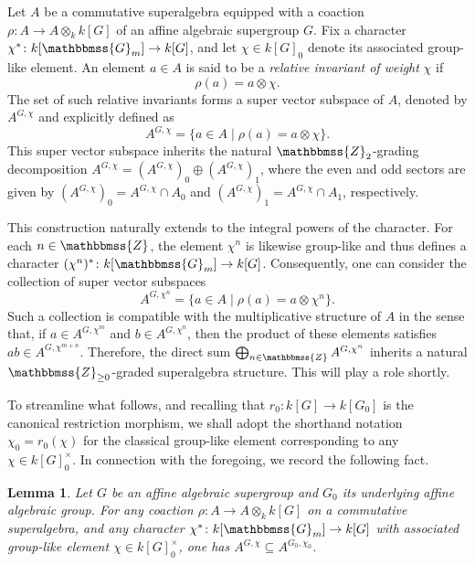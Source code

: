 \documentclass[11pt,a4paper,reqno,noamsfonts]{amsart}
\numberwithin{equation}{section}
\newtheorem{lemma}[theorem]{Lemma}
\theoremstyle{definition}
\theoremstyle{remark}
\newcommand{\GG}{\ensuremath{\mathbbmss{G}}}
\newcommand{\ZZ}{\ensuremath{\mathbbmss{Z}}}
\begin{document}
Let $A$ be a commutative superalgebra equipped with a coaction $\rho \colon A \to A \otimes_k k[G]$ of an affine algebraic supergroup $G$. Fix a character $\chi^{*} \colon k[\GG_m] \to k[G]$, and let $\chi \in k[G]_0$ denote its associated group-like element. An element $a \in A$ is said to be a \emph{relative invariant of weight} $\chi$ if
\begin{equation}
\rho(a) = a \otimes \chi.
\end{equation}
The set of such relative invariants forms a super vector subspace of $A$, denoted by $A^{G,\chi }$ and explicitly defined as
\begin{equation}
A^{G,\chi} = \{ a \in A \mid  \rho(a) = a \otimes \chi \}. 
\end{equation}
This super vector subspace inherits the natural $\ZZ_{2}$-grading decomposition $A^{G,\chi} = (A^{G,\chi})_0 \oplus (A^{G,\chi})_1$, where the even and odd sectors are given by $(A^{G,\chi})_0 = A^{G,\chi} \cap A_0$ and $(A^{G,\chi})_1 = A^{G,\chi} \cap A_1$, respectively.

This construction naturally extends to the integral powers of the character. For each $n \in \ZZ$, the element $\chi ^{n}$ is likewise group-like and thus defines a character $(\chi^n)^{*} \colon k[\GG_m] \to k[G]$. Consequently, one can consider the collection of super vector subspaces
\begin{equation}
A^{G,\chi^{n}} = \{ a \in A \mid  \rho(a) = a \otimes \chi^{n} \}. 
\end{equation}
Such a collection is compatible with the multiplicative structure of $A$ in the sense that, if $a \in A^{G,\chi^m}$ and $b \in A^{G,\chi^n}$, then the product of these elements satisfies $ab \in A^{G,\chi^{m+n}}$. Therefore, the direct sum $\bigoplus_{n \in \ZZ} A^{G,\chi^n}$ inherits a natural $\ZZ_{\geq 0}$-graded superalgebra structure. This will play a role shortly.

To streamline what follows, and recalling that $r_0 \colon k[G] \to k[G_0]$ is the canonical restriction morphism, we shall adopt the shorthand notation $\chi_0 = r_0(\chi)$ for the classical group-like element corresponding to any $\chi \in k[G]_0^{\times}$. In connection with the foregoing, we record the following fact.

\begin{lemma}\label{lem:4.1}
Let $G$ be an affine algebraic supergroup and $G_{0}$ its underlying affine algebraic group. For any coaction $\rho \colon A \to A \otimes_k k[G]$ on a commutative superalgebra, and any character $\chi^{*} \colon k[\GG_m] \to k[G]$ with associated group-like element $\chi \in k[G]_0^{\times}$, one has $A^{G,\chi } \subseteq A^{G_0,\chi_0}$. 
\end{lemma}
\end{document}
